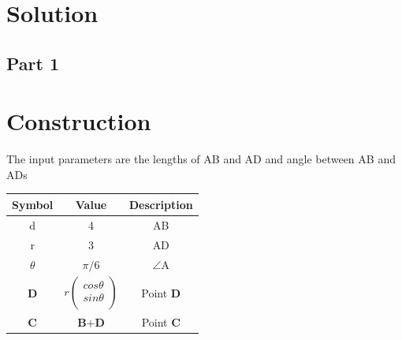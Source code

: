 \documentclass[journal,10pt,twocolumn]{article}
\begin{document}
\section*{Solution}
\subsection*{Part 1}
\section*{Construction}
The input parameters are the lengths of AB and AD and angle between AB and ADs \vspace{2mm}\\
{
\setlength\extrarowheight{2pt}
\begin{tabular}{|c|c|c|}
	\hline
	\textbf{Symbol}&\textbf{Value}&\textbf{Description}\\
	\hline
	d&4&AB\\
	\hline
	r&3&AD\\
	\hline
	$\theta$&$\pi/6$&$\angle$A\\
	\hline
	\textbf{D}&$r%
	\begin{pmatrix}
		cos\theta\\
		sin\theta\\
	\end{pmatrix}$%
	&Point \textbf{D}\\
	\hline
	\textbf{C}&\textbf{B}+\textbf{D}
	&Point \textbf{C}\\
	\hline
\end{tabular}
}
\end{document}

